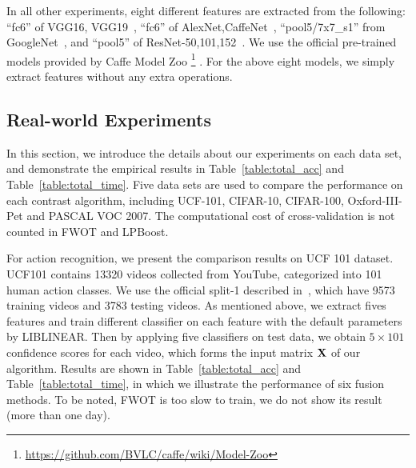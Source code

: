 \documentclass[10pt,twocolumn,letterpaper]{article}
\def\bX{{\bf X}}
\def\bX{{\bf X}}
\begin{document}
In all other experiments, eight different features are extracted from the following:
``fc6'' of VGG16, VGG19~\cite{chatfield2014return},
``fc6'' of AlexNet,CaffeNet~\cite{krizhevsky2012imagenet},
``pool5/7x7\_s1'' from GoogleNet~\cite{szegedy2015going},
and ``pool5'' of ResNet-50,101,152~\cite{he2015deep}.
We use the official pre-trained models provided by Caffe Model Zoo
\footnote{\url{https://github.com/BVLC/caffe/wiki/Model-Zoo}}
.
For the above eight models, we simply extract features without any extra operations.




\subsection{Real-world Experiments}

In this section, we introduce the details about our experiments on each data set,
and demonstrate the empirical results in Table~\ref{table:total_acc} and Table~\ref{table:total_time}.
Five data sets are used to compare the performance on each contrast algorithm, including UCF-101, CIFAR-10, CIFAR-100, Oxford-III-Pet and PASCAL VOC 2007.
The computational cost of cross-validation is not counted in FWOT and LPBoost.

For action recognition, we present the comparison results on UCF 101 dataset.
UCF101 contains 13320 videos collected from YouTube, categorized into 101 human action classes.
We use the official split-1 described in~\cite{soomro2012ucf101}, which have 9573 training videos and 3783 testing videos.
As mentioned above, we extract fives features and train different classifier on each feature with the default parameters by LIBLINEAR.
Then by applying five classifiers on test data, we obtain $5 \times 101$ confidence scores for each video, which forms the input matrix $\bX$ of our algorithm.
Results are shown in Table~\ref{table:total_acc} and Table~\ref{table:total_time}, in which we illustrate the performance of six fusion methods.
To be noted, FWOT is too slow to train, we do not show its result (more than one day).
\end{document}
